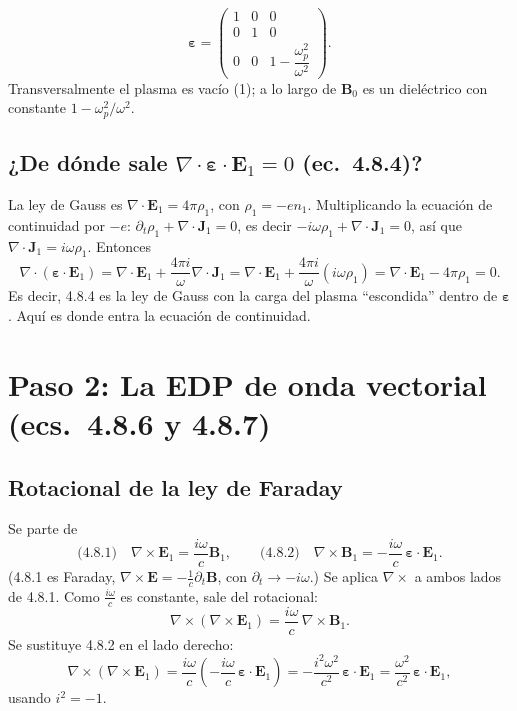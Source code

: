 \documentclass[11pt,a4paper]{article}
\newcommand{\E}{\mathbf{E}}
\newcommand{\B}{\mathbf{B}}
\newcommand{\J}{\mathbf{J}}
\newcommand{\eps}{\boldsymbol{\varepsilon}}
\renewcommand{\wp}{\omega_p}
\begin{document}
\begin{resultado}[Ecuación 4.8.5]
\[
\eps=\begin{pmatrix}1&0&0\\0&1&0\\0&0&1-\dfrac{\wp^2}{\omega^2}\end{pmatrix}.
\]
Transversalmente el plasma es vacío (1); a lo largo de $\B_0$ es un dieléctrico con constante $1-\wp^2/\omega^2$.
\end{resultado}

\subsection{¿De dónde sale $\nabla\cdot\eps\cdot\E_1=0$ (ec.\ 4.8.4)?}
La ley de Gauss es $\nabla\cdot\E_1=4\pi\rho_1$, con $\rho_1=-en_1$. Multiplicando la ecuación de continuidad por $-e$: $\partial_t\rho_1+\nabla\cdot\J_1=0$, es decir $-i\omega\rho_1+\nabla\cdot\J_1=0$, así que $\nabla\cdot\J_1=i\omega\rho_1$. Entonces
\[
\nabla\cdot(\eps\cdot\E_1)=\nabla\cdot\E_1+\frac{4\pi i}{\omega}\nabla\cdot\J_1
=\nabla\cdot\E_1+\frac{4\pi i}{\omega}(i\omega\rho_1)
=\nabla\cdot\E_1-4\pi\rho_1=0 .
\]
Es decir, 4.8.4 es la ley de Gauss con la carga del plasma ``escondida'' dentro de $\eps$. Aquí es donde entra la ecuación de continuidad.

\section{Paso 2: La EDP de onda vectorial (ecs.\ 4.8.6 y 4.8.7)}

\subsection{Rotacional de la ley de Faraday}
Se parte de
\[
\text{(4.8.1)}\quad\nabla\times\E_1=\frac{i\omega}{c}\B_1,
\qquad
\text{(4.8.2)}\quad\nabla\times\B_1=-\frac{i\omega}{c}\,\eps\cdot\E_1 .
\]
(4.8.1 es Faraday, $\nabla\times\E=-\frac1c\partial_t\B$, con $\partial_t\to-i\omega$.) Se aplica $\nabla\times$ a ambos lados de 4.8.1. Como $\frac{i\omega}{c}$ es constante, sale del rotacional:
\[
\nabla\times(\nabla\times\E_1)=\frac{i\omega}{c}\,\nabla\times\B_1 .
\]
Se sustituye 4.8.2 en el lado derecho:
\[
\nabla\times(\nabla\times\E_1)=\frac{i\omega}{c}\left(-\frac{i\omega}{c}\,\eps\cdot\E_1\right)
=-\frac{i^2\omega^2}{c^2}\,\eps\cdot\E_1=\frac{\omega^2}{c^2}\,\eps\cdot\E_1 ,
\]
usando $i^2=-1$.
\end{document}

